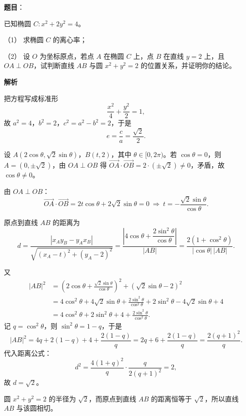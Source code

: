 \begin{answer}

\textbf{题目}：

已知椭圆 $C:x^2+2y^2=4$。

（1） 求椭圆 $C$ 的离心率；

（2） 设 $O$ 为坐标原点，若点 $A$ 在椭圆 $C$ 上，点 $B$ 在直线 $y=2$ 上，且 $OA\perp OB$，试判断直线 $AB$ 与圆 $x^2+y^2=2$ 的位置关系，并证明你的结论。

\textbf{解析}


把方程写成标准形
\nopagebreak[4]
\[\frac{x^2}4+\frac{y^2}2=1,\]
故 $a^2=4$，$b^2=2$，$c^2=a^2-b^2=2$，于是
\nopagebreak[4]
\[e=\frac ca=\frac{\sqrt2}{2} .\]


设 $A(2\cos\theta,\sqrt2\sin\theta)$，$B(t,2)$，其中 $\theta\in[0,2\pi)$。若 $\cos\theta=0$，则 $A=(0,\pm\sqrt2)$，由 $OA\perp OB$ 得 $\overrightarrow{OA}\cdot\overrightarrow{OB}=2\cdot(\pm\sqrt2)\neq0$，矛盾，故 $\cos\theta\neq0$。

由 $OA\perp OB$：
\nopagebreak[4]
\[\overrightarrow{OA}\cdot\overrightarrow{OB}=2t\cos\theta+2\sqrt2\sin\theta=0\ \Rightarrow\ t=-\frac{\sqrt2\sin\theta}{\cos\theta} .\]

原点到直线 $AB$ 的距离为
\nopagebreak[4]
\[d=\frac{|x_Ay_B-y_Ax_B|}{\sqrt{(x_A-t)^2+(y_A-2)^2}}
=\frac{\left|4\cos\theta+\dfrac{2\sin^2\theta}{\cos\theta}\right|}{|AB|}
=\frac{2(1+\cos^2\theta)}{|\cos\theta|\,|AB|} .\]

又
\nopagebreak[4]
\[\begin{aligned}
|AB|^2&=\left(2\cos\theta+\frac{\sqrt2\sin\theta}{\cos\theta}\right)^2+\left(\sqrt2\sin\theta-2\right)^2\\
&=4\cos^2\theta+4\sqrt2\sin\theta+\frac{2\sin^2\theta}{\cos^2\theta}
+2\sin^2\theta-4\sqrt2\sin\theta+4\\
&=4\cos^2\theta+2\sin^2\theta+4+\frac{2\sin^2\theta}{\cos^2\theta}.
\end{aligned}\]
记 $q=\cos^2\theta$，则 $\sin^2\theta=1-q$，于是
\nopagebreak[4]
\[|AB|^2=4q+2(1-q)+4+\frac{2(1-q)}q=2q+6+\frac{2(1-q)}q=\frac{2(q+1)^2}{q} .\]
代入距离公式：
\nopagebreak[4]
\[d^2=\frac{4(1+q)^2}{q}\cdot\frac{q}{2(q+1)^2}=2,\]
故 $d=\sqrt2$。

圆 $x^2+y^2=2$ 的半径为 $\sqrt2$，而原点到直线 $AB$ 的距离恒等于 $\sqrt2$，所以直线 $AB$ 与该圆相切。



\end{answer}
